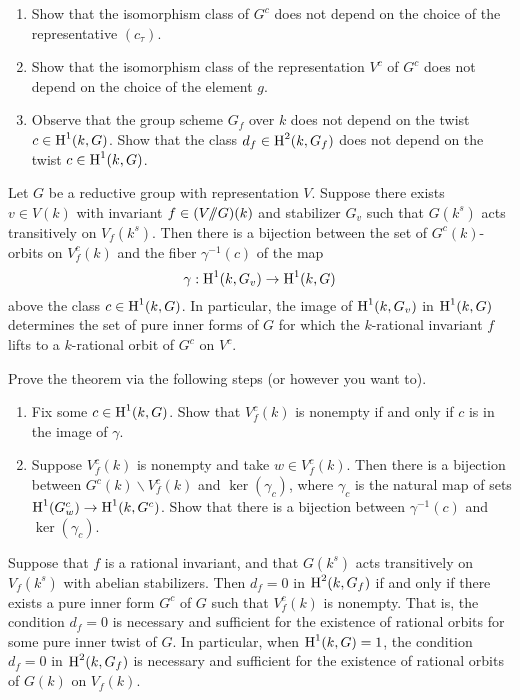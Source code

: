 \begin{exercise}
\begin{enumerate}
  \item Show that the isomorphism class of $G^c$ does not depend on the choice 
    of the representative $(c_\tau)$. 
  \item Show that the isomorphism class of the representation $V^c$ of $G^c$ 
    does not depend on the choice of the element $g$. 
  \item Observe that the group scheme $G_f$ over $k$ does not depend on the 
    twist $c\in \operatorname{H}^1(k,G)$. Show that the class $d_f\in \operatorname{H}^2(k,G_f)$ does not 
    depend on the twist $c\in \operatorname{H}^1(k,G)$. 
\end{enumerate}
\end{exercise}

\begin{theo*}
Let $G$ be a reductive group with representation $V$. Suppose there exists 
$v\in V(k)$ with invariant $f\in (V/\!\!/ G)(k)$ and stabilizer $G_v$ such that 
$G(k^s)$ acts transitively on $V_f(k^s)$. Then there is a bijection between the 
set of $G^c(k)$-orbits on $V_f^c(k)$ and the fiber $\gamma^{-1}(c)$ of the map 
\[
  \gamma:\operatorname{H}^1(k,G_v) \to \operatorname{H}^1(k,G) 
\]
above the class $c\in \operatorname{H}^1(k,G)$. In particular, the image of $\operatorname{H}^1(k,G_v)$ in 
$\operatorname{H}^1(k,G)$ determines the set of pure inner forms of $G$ for which the 
$k$-rational invariant $f$ lifts to a $k$-rational orbit of $G^c$ on $V^c$. 
\end{theo*}

\begin{exercise}
Prove the theorem via the following steps (or however you want to). 
\begin{enumerate}
  \item Fix some $c\in \operatorname{H}^1(k,G)$. Show that $V_f^c(k)$ is nonempty if and only 
    if $c$ is in the image of $\gamma$. 
  \item Suppose $V_f^c(k)$ is nonempty and take $w\in V_f^c(k)$. Then there is a 
    bijection between $G^c(k)\backslash V_f^c(k)$ and $\ker(\gamma_c)$, where 
    $\gamma_c$ is the natural map of sets $\operatorname{H}^1(G_w^c)\to \operatorname{H}^1(k,G^c)$. Show 
    that there is a bijection between $\gamma^{-1}(c)$ and $\ker(\gamma_c)$. 
\end{enumerate}
\end{exercise}

\begin{theo*}
Suppose that $f$ is a rational invariant, and that $G(k^s)$ acts transitively 
on $V_f(k^s)$ with abelian stabilizers. Then $d_f=0$ in $\operatorname{H}^2(k,G_f)$ if and 
only if there exists a pure inner form $G^c$ of $G$ such that $V_f^c(k)$ is 
nonempty. That is, the condition $d_f=0$ is necessary and sufficient for the 
existence of rational orbits for some pure inner twist of $G$. In particular, 
when $\operatorname{H}^1(k,G)=1$, the condition $d_f=0$ in $\operatorname{H}^2(k,G_f)$ is necessary and 
sufficient for the existence of rational orbits of $G(k)$ on $V_f(k)$. 
\end{theo*}


